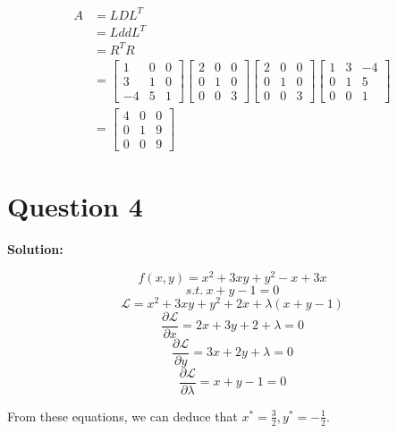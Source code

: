 \documentclass[11pt]{article} %
\begin{document}
\begin{align*}
	A&=LDL^{T}\\
	&=LddL^{T}\\
	&=R^{T}R\\
	&=\begin{bmatrix}
		1&0&0\\
		3&1&0\\
		-4&5&1
	\end{bmatrix}\begin{bmatrix}
	2&0&0\\
	0&1&0\\
	0&0&3
\end{bmatrix}\begin{bmatrix}
2&0&0\\
0&1&0\\
0&0&3
\end{bmatrix}\begin{bmatrix}
1&3&-4\\
0&1&5\\
0&0&1
\end{bmatrix}\\
&=\begin{bmatrix}
	4&0&0\\
	0&1&9\\
	0&0&9
\end{bmatrix}
\end{align*}



\section{Question 4}
\textbf{Solution:}

$$f(x,y)=x^2+3xy+y^2-x+3x$$
$$s.t.\ x+y-1=0$$
$$\mathcal{L}=x^2+3xy+y^2+2x+\lambda(x+y-1)$$
\begin{equation}
	\frac{\partial \mathcal{L}}{\partial x}=2x+3y+2+\lambda=0
\end{equation}
\begin{equation}
	\frac{\partial \mathcal{L}}{\partial y}=3x+2y+\lambda=0
\end{equation}
\begin{equation}
	\frac{\partial \mathcal{L}}{\partial \lambda}=x+y-1=0
\end{equation}

From these equations, we can deduce that $x^*=\frac{3}{2}, y^*=-\frac{1}{2}$. 
	
	
	
	
	
	
	
\end{document}
